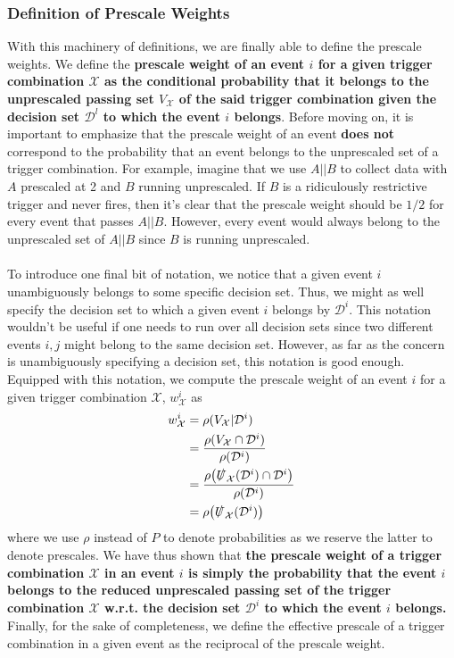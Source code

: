 \subsubsection{Definition of Prescale Weights}
\label{subsubsec:app-prw-definition-of-prw-weights}
With this machinery of definitions, we are finally able to define the prescale weights. We define the {\textbf{prescale weight of an event $i$ for a given trigger combination $\mathcal{X}$ as the conditional probability that it belongs to the unprescaled passing set $V_\mathcal{X}$ of the said trigger combination given the decision set $\mathcal{D}^l$ to which the event $i$ belongs}}. Before moving on, it is important to emphasize that the prescale weight of an event \textbf{does not} correspond to the probability that an event belongs to the unprescaled set of a trigger combination. For example, imagine that we use $A\vert\vert B$ to collect data with $A$ prescaled at 2 and $B$ running unprescaled. If $B$ is a ridiculously restrictive trigger and never fires, then it's clear that the prescale weight should be $1/2$ for every event that passes $A\vert\vert B$. However, every event would always belong to the unprescaled set of $A\vert\vert B$ since $B$ is running unprescaled. \\\\
To introduce one final bit of notation, we notice that a given event $i$ unambiguously belongs to some specific decision set. Thus, we might as well specify the decision set to which a given event $i$ belongs by $\mathcal{D}^i$. This notation wouldn't be useful if one needs to run over all decision sets since two different events $i,j$ might belong to the same decision set. However, as far as the concern is unambiguously specifying a decision set, this notation is good enough. Equipped with this notation, we compute the prescale weight of an event $i$ for a given trigger combination $\mathcal{X}$, $w_{\mathcal{X}}^i$ as 
\begin{align}
\label{eq:prescale-weight-def}
    w_{\mathcal{X}}^i&=\rho(V_\mathcal{X} \vert \mathcal{D}^{i})\\
    &=\frac{\rho(V_\mathcal{X}\cap \mathcal{D}^{i})}{\rho(\mathcal{D}^{i})}\\
    &=\frac{\rho\big(\slashed{U}_{\mathcal{X}}(\mathcal{D}^i)\cap \mathcal{D}^i\big)}{\rho(\mathcal{D}^{i})}\\
    &=\rho\big(\slashed{U}_{\mathcal{X}}(\mathcal{D}^i)\big)
\end{align}
where we use $\rho$ instead of $P$ to denote probabilities as we reserve the latter to denote prescales. %
We have thus shown that \textbf{the prescale weight of a trigger combination $\mathcal{X}$ in an event $i$ is simply the probability that the event $i$ belongs to the reduced unprescaled passing set of the trigger combination $\mathcal{X}$ w.r.t. the decision set $\mathcal{D}^i$ to which the event $i$ belongs.} %
Finally, for the sake of completeness, we define the effective prescale of a trigger combination in a given event as the reciprocal of the prescale weight. 
